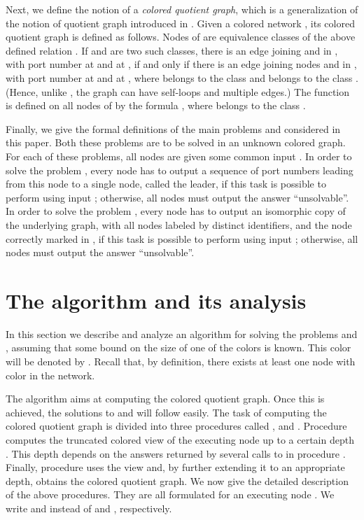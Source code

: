 \documentclass[a4paper,10pt]{article}
\begin{document}
Next, we define the notion of a {\em colored quotient graph}, which is a generalization of the
notion of quotient graph introduced in  \cite{YK3}. Given a colored network , its colored quotient
graph  is defined as follows.  Nodes of  are equivalence classes of the above defined relation . If  and  are two such classes, there is an edge joining  and 
in , with port number  at  and  at , if and only if there is an edge joining nodes  and
 in , with port number  at  and  at , where  belongs to the class  and  belongs to the class . (Hence, unlike , the graph  can have self-loops and multiple
edges.) The function  is defined on all nodes of  by the formula
, where  belongs to the class . 

Finally, we give the formal definitions of the main problems  and  considered in this paper. Both these problems are to be solved in an unknown colored graph.
For each of these problems, all nodes are given some common input .
In order to solve the problem , every node has to output a sequence of port numbers leading from this node to a single node, called the leader, if this task is possible to perform using input ;
otherwise, all nodes must output the answer ``unsolvable''. In order to solve the problem , every node  has to output an isomorphic copy  of the underlying graph, with all nodes labeled by distinct identifiers, and the node  correctly marked in ,  if this task is possible to perform using input ;
otherwise, all nodes must output the answer ``unsolvable''.


\section{The algorithm and its analysis}  \label{sec:algorithm}

In this section we describe and analyze an algorithm for solving the problems  and , assuming that some bound  on the size of one of the colors is known.
This color will be denoted by .
Recall that, by definition, there exists at least one node with color  in the network.

The algorithm aims at computing the colored quotient graph.
Once this is achieved, the solutions to  and  will follow easily.
The task of computing the colored quotient graph is divided into three procedures called ,  and .
Procedure  computes the truncated colored view of the executing node up to a certain depth .
This depth  depends on the answers returned by several calls to  in procedure .
Finally, procedure  uses the view and, by further extending it to an appropriate depth, obtains the colored quotient graph.
We now give the detailed description of the above procedures.
They are all formulated for an executing node .
We write  and  instead of  and , respectively.
\end{document}

